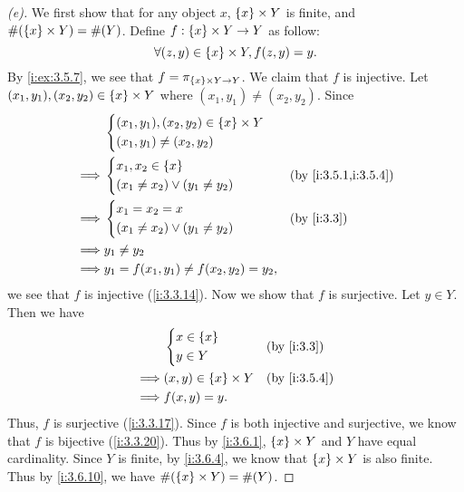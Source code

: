 \begin{proof}[(e)]
  We first show that for any object \(x\), \(\left\lbrace x\right\rbrace \times Y\) is finite, and \(\#(\left\lbrace x\right\rbrace \times Y) = \#(Y)\).
  Define \(f : \left\lbrace x\right\rbrace \times Y \to Y\) as follow:
  \[
    \forall (z, y) \in \left\lbrace x\right\rbrace \times Y, f(z, y) = y.
  \]
  By \cref{i:ex:3.5.7}, we see that \(f = \pi_{\left\lbrace x\right\rbrace \times Y \to Y}\).
  We claim that \(f\) is injective.
  Let \((x_1, y_1), (x_2, y_2) \in \left\lbrace x\right\rbrace \times Y\) where \((x_1, y_1) \neq (x_2, y_2)\).
  Since
  \begin{align*}
             & \begin{dcases}
                 (x_1, y_1), (x_2, y_2) \in \set{x} \times Y \\
                 (x_1, y_1) \neq (x_2, y_2)
               \end{dcases}        \\
    \implies & \begin{dcases}
                 x_1, x_2 \in \set{x} \\
                 (x_1 \neq x_2) \lor (y_1 \neq y_2)
               \end{dcases}             &  & \by{i:3.5.1,i:3.5.4} \\
    \implies & \begin{dcases}
                 x_1 = x_2 = x \\
                 (x_1 \neq x_2) \lor (y_1 \neq y_2)
               \end{dcases}             &  & \by{i:3.3}           \\
    \implies & y_1 \neq y_2                                       \\
    \implies & y_1 = f(x_1, y_1) \neq f(x_2, y_2) = y_2,
  \end{align*}
  we see that \(f\) is injective (\cref{i:3.3.14}).
  Now we show that \(f\) is surjective.
  Let \(y \in Y\).
  Then we have
  \begin{align*}
             & \begin{dcases}
                 x \in \set{x} \\
                 y \in Y
               \end{dcases}            &  & \by{i:3.3}       \\
    \implies & (x, y) \in \set{x} \times Y &  & \by{i:3.5.4} \\
    \implies & f(x, y) = y.
  \end{align*}
  Thus, \(f\) is surjective (\cref{i:3.3.17}).
  Since \(f\) is both injective and surjective, we know that \(f\) is bijective (\cref{i:3.3.20}).
  Thus by \cref{i:3.6.1}, \(\left\lbrace x\right\rbrace \times Y\) and \(Y\) have equal cardinality.
  Since \(Y\) is finite, by \cref{i:3.6.4}, we know that \(\left\lbrace x\right\rbrace \times Y\) is also finite.
  Thus by \cref{i:3.6.10}, we have \(\#(\left\lbrace x\right\rbrace \times Y) = \#(Y)\).


\end{proof}
